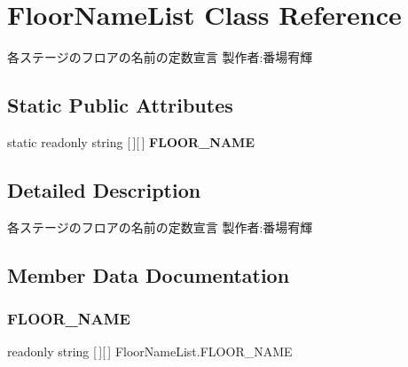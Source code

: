 \hypertarget{class_floor_name_list}{}\section{Floor\+Name\+List Class Reference}
\label{class_floor_name_list}


各ステージのフロアの名前の定数宣言 製作者\+:番場宥輝  


\subsection*{Static Public Attributes}
\begin{DoxyCompactItemize}
\item 
static readonly string \mbox{[}$\,$\mbox{]}\mbox{[}$\,$\mbox{]} {\bfseries F\+L\+O\+O\+R\+\_\+\+N\+A\+ME}
\end{DoxyCompactItemize}


\subsection{Detailed Description}
各ステージのフロアの名前の定数宣言 製作者\+:番場宥輝 



\subsection{Member Data Documentation}
\mbox{\label{class_floor_name_list_a0f8d4546b5738958f6e2dd5a24ffffdc}} 
\subsubsection{\texorpdfstring{F\+L\+O\+O\+R\+\_\+\+N\+A\+ME}{FLOOR\_NAME}}
{\footnotesize\ttfamily readonly string \mbox{[}$\,$\mbox{]}\mbox{[}$\,$\mbox{]} Floor\+Name\+List.\+F\+L\+O\+O\+R\+\_\+\+N\+A\+ME\hspace{0.3cm}{\ttfamily [static]}}

